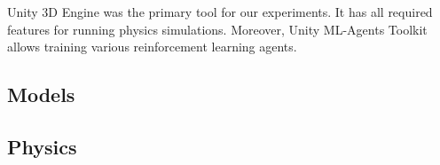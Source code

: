 
Unity 3D Engine was the primary tool for our experiments.
It has all required features for running physics simulations.
Moreover, Unity ML-Agents Toolkit allows training various reinforcement learning agents.

\subsection{Models}\label{subsec:models}


\subsection{Physics}\label{subsec:physics}

